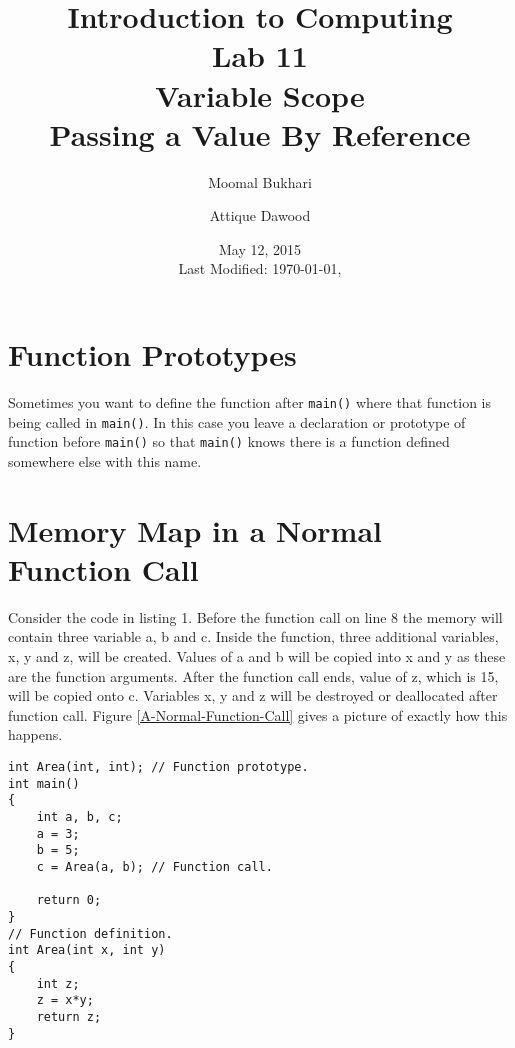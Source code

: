 \documentclass[12pt,a4paper]{article}
\title{Introduction to Computing\\Lab 11\\Variable Scope\\Passing a Value By Reference}
\author{Moomal Bukhari\and Attique Dawood}
\date{May 12, 2015\\[0.2cm] Last Modified: \today, \currenttime}
\begin{document}
\maketitle
\section{Function Prototypes}
Sometimes you want to define the function after \verb|main()| where that function is being called in \verb|main()|. In this case you leave a declaration or prototype of function before \verb|main()| so that \verb|main()| knows there is a function defined somewhere else with this name.
\section{Memory Map in a Normal Function Call}
Consider the code in listing 1. Before the function call on line 8 the memory will contain three variable a, b and c. Inside the function, three additional variables, x, y and z, will be created. Values of a and b will be copied into x and y as these are the function arguments. After the function call ends, value of z, which is 15, will be copied onto c. Variables x, y and z will be destroyed or deallocated after function call. Figure \ref{A-Normal-Function-Call} gives a picture of exactly how this happens.
\begin{lstlisting}[caption={Calling a function}]
int Area(int, int); // Function prototype.
int main()
{
	int a, b, c;
	a = 3;
	b = 5;
	c = Area(a, b); // Function call.
	
	return 0;
}
// Function definition.
int Area(int x, int y)
{
	int z;
	z = x*y;
	return z;
}
\end{lstlisting}
\end{document}
